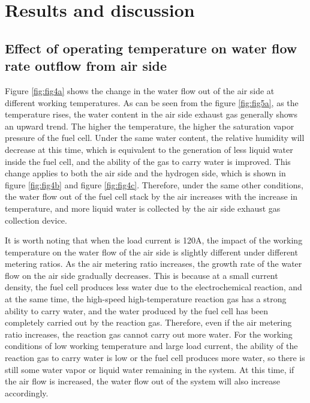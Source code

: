 \section{Results and discussion}
\subsection{Effect of operating temperature on water flow rate outflow from air side}

Figure \ref{fig:fig4a} shows the change in the water flow out of the air side at different working temperatures. As can be seen from the figure \ref{fig:fig5a}, as the temperature rises, the water content in the air side exhaust gas generally shows an upward trend. The higher the temperature, the higher the saturation vapor pressure of the fuel cell. Under the same water content, the relative humidity will decrease at this time, which is equivalent to the generation of less liquid water inside the fuel cell, and the ability of the gas to carry water is improved. This change applies to both the air side and the hydrogen side, which is shown in figure \ref{fig:fig4b} and figure \ref{fig:fig4c}. Therefore, under the same other conditions, the water flow out of the fuel cell stack by the air increases with the increase in temperature, and more liquid water is collected by the air side exhaust gas collection device.
\par
It is worth noting that when the load current is 120A, the impact of the working temperature on the water flow of the air side is slightly different under different metering ratios. As the air metering ratio increases, the growth rate of the water flow on the air side gradually decreases. This is because at a small current density, the fuel cell produces less water due to the electrochemical reaction, and at the same time, the high-speed high-temperature reaction gas has a strong ability to carry water, and the water produced by the fuel cell has been completely carried out by the reaction gas. Therefore, even if the air metering ratio increases, the reaction gas cannot carry out more water. For the working conditions of low working temperature and large load current, the ability of the reaction gas to carry water is low or the fuel cell produces more water, so there is still some water vapor or liquid water remaining in the system. At this time, if the air flow is increased, the water flow out of the system will also increase accordingly.
